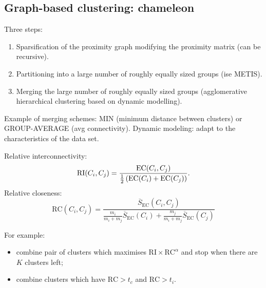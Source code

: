 \documentclass[a4paper,9pt]{extarticle}
\begin{document}
\begin{multicols*}{2}
\subsection{Graph-based clustering: chameleon}
Three steps:
\begin{enumerate}
	\item Sparsification of the proximity graph modifying the proximity matrix (can be recursive).
	\item Partitioning into a large number of roughly equally sized groups (ise METIS).
	\item Merging the large number of roughly equally sized groups (agglomerative hierarchical clustering based on dynamic modelling).
\end{enumerate}
Example of merging schemes: MIN (minimum distance between clusters) or GROUP-AVERAGE (avg connectivity). Dynamic modeling: adapt to the characteristics of the data set.
\begin{riquadro}
	Relative interconnectivity:
	\begin{equation*}
		\mathrm{RI}(C_{i},C_{j})=\frac{\mathrm{EC}(C_{i},C_{j})}{\frac{1}{2}\left(\mathrm{EC}(C_{i})+\mathrm{EC}(C_{j})\right)}.
	\end{equation*}
	Relative closeness:
	\begin{equation*}
		\mathrm{RC}(C_{i},C_{j})=\frac{\overline{S}_{\mathrm{EC}}(C_{i},C_{j})}{\frac{m_{i}}{m_{i}+m_{j}}\overline{S}_{\mathrm{EC}}(C_{i})+\frac{m_{j}}{m_{i}+m_{j}}\overline{S}_{\mathrm{EC}}(C_{j})}
	\end{equation*}
\end{riquadro} 
For example: \begin{itemize}
	\item combine pair of clusters which maximises $\mathrm{RI}\times \mathrm{RC}^{\alpha}$ and stop when there are $K$ clusters left;
	\item combine clusters which have $\mathrm{RC}>t_{c}$ and $\mathrm{RC}>t_{i}$.
\end{itemize}

\end{multicols*}
\end{document}
